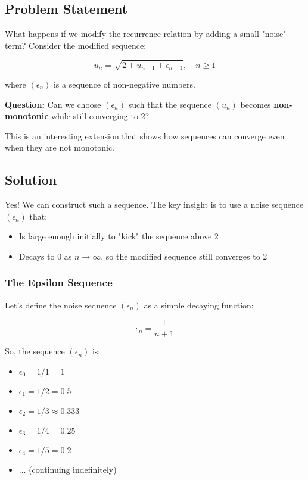 \documentclass[12pt,a4paper]{article}
\theoremstyle{definition}
\begin{document}
\subsection{Problem Statement}

What happens if we modify the recurrence relation by adding a small "noise" term? Consider the modified sequence:

\begin{equation}
u_n = \sqrt{2 + u_{n-1} + \epsilon_{n-1}}, \quad n \geq 1
\end{equation}

where $(\epsilon_n)$ is a sequence of non-negative numbers. 

\textbf{Question:} Can we choose $(\epsilon_n)$ such that the sequence $(u_n)$ becomes \textbf{non-monotonic} while still converging to 2?

This is an interesting extension that shows how sequences can converge even when they are not monotonic.

\subsection{Solution}

Yes! We can construct such a sequence. The key insight is to use a noise sequence $(\epsilon_n)$ that:
\begin{itemize}
    \item Is large enough initially to "kick" the sequence above 2
    \item Decays to 0 as $n \to \infty$, so the modified sequence still converges to 2
\end{itemize}

\subsubsection{The Epsilon Sequence}

Let's define the noise sequence $(\epsilon_n)$ as a simple decaying function:

\[
\epsilon_n = \frac{1}{n+1}
\]

So, the sequence $(\epsilon_n)$ is:
\begin{itemize}
    \item $\epsilon_0 = 1/1 = 1$
    \item $\epsilon_1 = 1/2 = 0.5$
    \item $\epsilon_2 = 1/3 \approx 0.333$
    \item $\epsilon_3 = 1/4 = 0.25$
    \item $\epsilon_4 = 1/5 = 0.2$
    \item $\ldots$ (continuing indefinitely)
\end{itemize}
\end{document}
